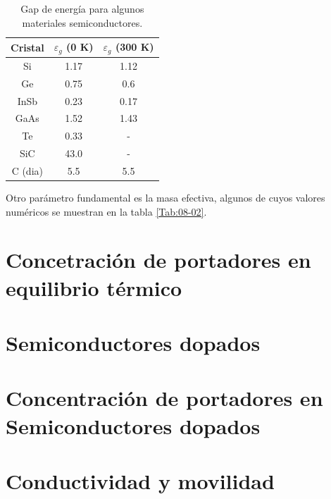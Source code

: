\begin{table}
\begin{tabular}{ccc}
	Cristal & $\varepsilon_g$ (0 K) & $\varepsilon_g$ (300 K) \\ \hline
	Si & 1.17 & 1.12 \\
	Ge & 0.75 & 0.6 \\
	InSb & 0.23 & 0.17 \\ 
	GaAs & 1.52 & 1.43 \\
	Te & 0.33 & - \\ 
	SiC & 43.0 & - \\
	C (dia) & 5.5 & 5.5
\end{tabular}
\caption{Gap de energía para algunos materiales semiconductores.}
\label{Tab:08-01}
\end{table}
Otro parámetro fundamental es la masa efectiva, algunos de cuyos valores numéricos se muestran en la tabla \ref{Tab:08-02}.

\section{Concetración de portadores en equilibrio térmico}

\section{Semiconductores dopados}

\section{Concentración de portadores en Semiconductores dopados}

\section{Conductividad y movilidad}


